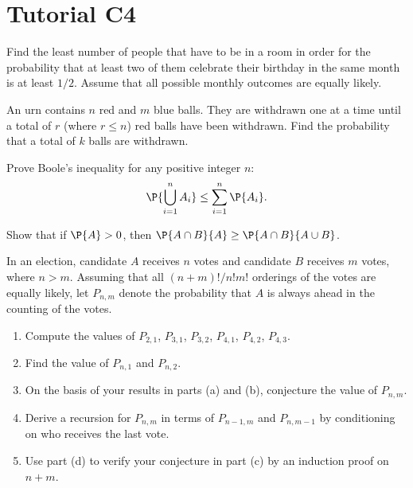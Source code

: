 \section{Tutorial C4}

\begin{problem}
    Find the least number of people that have to be in a room in order for the probability that at least two of them celebrate their birthday in the same month is at least $1/2$. Assume that all possible monthly outcomes are equally likely.
\end{problem}

\begin{problem}
    An urn contains $n$ red and $m$ blue balls. They are withdrawn one at a time until a total of $r$ (where $r \leq n$) red balls have been withdrawn. Find the probability that a total of $k$ balls are withdrawn.
\end{problem}

\begin{problem}
    Prove Boole's inequality for any positive integer $n$: \[\P{\bigcup_{i = 1}^n A_i} \leq \sum_{i = 1}^n \P{A_i}.\]
\end{problem}

\begin{problem}
    Show that if $\P{A} > 0$, then $\P{A \cap B}{A} \geq \P{A \cap B}{A \cup B}$.
\end{problem}

\begin{problem}
    In an election, candidate $A$ receives $n$ votes and candidate $B$ receives $m$ votes, where $n > m$. Assuming that all $(n+m)!/n!m!$ orderings of the votes are equally likely, let $P_{n,m}$ denote the probability that $A$ is always ahead in the counting of the votes.

    \begin{enumerate}
        \item Compute the values of $P_{2,1}$, $P_{3,1}$, $P_{3,2}$, $P_{4,1}$, $P_{4,2}$, $P_{4,3}$.
        \item Find the value of $P_{n, 1}$ and $P_{n, 2}$.
        \item On the basis of your results in parts (a) and (b), conjecture the value of $P_{n,m}$.
        \item Derive a recursion for $P_{n,m}$ in terms of $P_{n-1, m}$ and $P_{n, m-1}$ by conditioning on who receives the last vote.
        \item Use part (d) to verify your conjecture in part (c) by an induction proof on $n+m$.
    \end{enumerate}
\end{problem}

